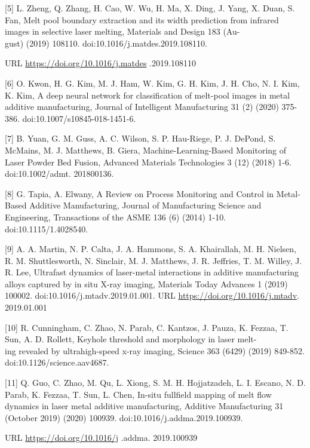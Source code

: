 \documentclass[10pt]{article}
\begin{document}
[5] L. Zheng, Q. Zhang, H. Cao, W. Wu, H. Ma, X. Ding, J. Yang, X. Duan, S. Fan, Melt pool boundary extraction and its width prediction from infrared images in selective laser melting, Materials and Design 183 (Au-\\
gust) (2019) 108110. doi:10.1016/j.matdes.2019.108110.

URL \href{https://doi.org/10.1016/j.matdes}{https://doi.org/10.1016/j.matdes} .2019.108110

[6] O. Kwon, H. G. Kim, M. J. Ham, W. Kim, G. H. Kim, J. H. Cho, N. I. Kim, K. Kim, A deep neural network for classification of melt-pool images in metal additive manufacturing, Journal of Intelligent Manufacturing 31 (2) (2020) 375-386. doi:10.1007/s10845-018-1451-6.

[7] B. Yuan, G. M. Guss, A. C. Wilson, S. P. Hau-Riege, P. J. DePond, S. McMains, M. J. Matthews, B. Giera, Machine-Learning-Based Monitoring of Laser Powder Bed Fusion, Advanced Materials Technologies 3 (12) (2018) 1-6. doi:10.1002/admt. 201800136.

[8] G. Tapia, A. Elwany, A Review on Process Monitoring and Control in Metal-Based Additive Manufacturing, Journal of Manufacturing Science and Engineering, Transactions of the ASME 136 (6) (2014) 1-10. doi:10.1115/1.4028540.

[9] A. A. Martin, N. P. Calta, J. A. Hammons, S. A. Khairallah, M. H. Nielsen, R. M. Shuttlesworth, N. Sinclair, M. J. Matthews, J. R. Jeffries, T. M. Willey, J. R. Lee, Ultrafast dynamics of laser-metal interactions in additive manufacturing alloys captured by in situ X-ray imaging, Materials Today Advances 1 (2019) 100002. doi:10.1016/j.mtadv.2019.01.001. URL \href{https://doi.org/10.1016/j.mtadv}{https://doi.org/10.1016/j.mtadv}. 2019.01.001

[10] R. Cunningham, C. Zhao, N. Parab, C. Kantzos, J. Pauza, K. Fezzaa, T. Sun, A. D. Rollett, Keyhole threshold and morphology in laser melt-\\
ing revealed by ultrahigh-speed x-ray imaging, Science 363 (6429) (2019) 849-852. doi:10.1126/science.aav4687.

[11] Q. Guo, C. Zhao, M. Qu, L. Xiong, S. M. H. Hojjatzadeh, L. I. Escano, N. D. Parab, K. Fezzaa, T. Sun, L. Chen, In-situ fullfield mapping of melt flow dynamics in laser metal additive manufacturing, Additive Manufacturing 31 (October 2019) (2020) 100939. doi:10.1016/j.addma.2019.100939.

URL \href{https://doi.org/10.1016/j}{https://doi.org/10.1016/j} .addma. 2019.100939
\end{document}
